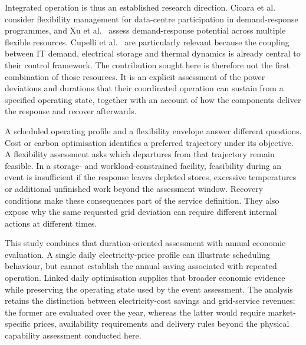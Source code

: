 Integrated operation is thus an established research direction. Cioara et al.~\cite{cioara2018optimized} consider flexibility management for data-centre participation in demand-response programmes, and Xu et al.~\cite{Xu2023SPIE} assess demand-response potential across multiple flexible resources. Cupelli et al.~\cite{cupelli2018data} are particularly relevant because the coupling between IT demand, electrical storage and thermal dynamics is already central to their control framework. The contribution sought here is therefore not the first combination of those resources. It is an explicit assessment of the power deviations and durations that their coordinated operation can sustain from a specified operating state, together with an account of how the components deliver the response and recover afterwards.

A scheduled operating profile and a flexibility envelope answer different questions. Cost or carbon optimisation identifies a preferred trajectory under its objective. A flexibility assessment asks which departures from that trajectory remain feasible. In a storage- and workload-constrained facility, feasibility during an event is insufficient if the response leaves depleted stores, excessive temperatures or additional unfinished work beyond the assessment window. Recovery conditions make these consequences part of the service definition. They also expose why the same requested grid deviation can require different internal actions at different times.

This study combines that duration-oriented assessment with annual economic evaluation. A single daily electricity-price profile can illustrate scheduling behaviour, but cannot establish the annual saving associated with repeated operation. Linked daily optimisation supplies that broader economic evidence while preserving the operating state used by the event assessment. The analysis retains the distinction between electricity-cost savings and grid-service revenues: the former are evaluated over the year, whereas the latter would require market-specific prices, availability requirements and delivery rules beyond the physical capability assessment conducted here.
